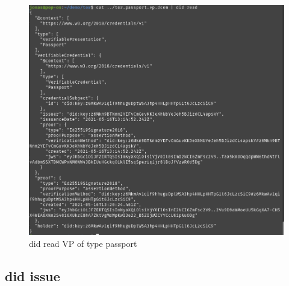 \begin{itemize}
  \begin{figure}
  \centering
  \includegraphics[width=\textwidth]{User Interface f8759a9462b24d5f95cf6123d68b89ea/Untitled 9.png}
  \caption{did read VP of type passport}
  \end{figure}
\end{itemize}

\hypertarget{did-issue}{%
\subsection{\texorpdfstring{did issue }{did issue  }}\label{did-issue}}

